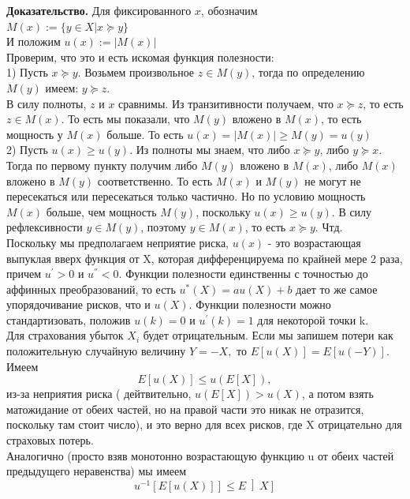 \documentclass[12pt,a4paper]{article}
\begin{document}
{\large \bf Доказательство.} Для фиксированного $x$, обозначим \\
$M(x) := \{ y \in X | x \succeq y\}$\\
И положим $u(x):= |M(x)|$\\
Проверим, что это и есть искомая функция полезности:\\
1) Пусть $x \succeq y$. Возьмем произвольное $z \in M(y)$, тогда по определению $M(y)$ имеем: $y \succeq z$.\\
В силу полноты, $z$ и $x$ сравнимы. Из транзитивности получаем, что $x \succeq z$, то есть $z \in M(x)$.
То есть мы показали, что $M(y)$ вложено в $M(x)$, то есть мощность у $M(x)$ больше. 
То есть $u(x) = |M(x)| \geq M(y) = u(y)$\\
2) Пусть $u(x) \geq u(y)$. Из полноты мы знаем, что либо $x \succeq y$, либо $y \succeq x$. 
Тогда по первому пункту получим либо $M(y)$ вложено в $M(x)$, либо $M(x)$ вложено в $M(y)$ соответственно. То есть $M(x)$ и $M(y)$ не могут не пересекаться или пересекаться только частично. Но по условию мощность $M(x)$ больше, чем мощность $M(y)$, поскольку $u(x) \geq u(y)$.
 В силу рефлексивности  $y \in M(y)$, поэтому  $y \in M(x)$, то есть $ x \succeq y$. Чтд. \\


Поскольку мы предполагаем неприятие риска, $u(x)$ - это возрастающая выпуклая вверх функция от X,  которая дифференцируема по крайней мере 2 раза, причем $u^{'} > 0$ и $u^{''} < 0.$ Функции полезности единственны с точностью до аффинных преобразований, то есть $u^{*}(X) = au(X) + b $ дает то же самое упорядочивание рисков, что и $u(X).$ Функции полезности можно стандартизовать, положив $u(k)=0$ и $u^{'}(k) = 1$ для некоторой точки k.\\
Для страхования убыток $X_i$ будет отрицательным. Если мы запишем потери как положительную случайную величину $Y=-X,$ то $ E \left[ u(X) \right]  = E  \left[ u(-Y) \right] . $\\

Имеем $$ E \left[  u(X) \right]   \leq  u(E  \left[  X \right]  ),$$
 из-за неприятия риска ( дейтвительно, $u(E  \left[  X \right]  ) >  u(X)$, а потом взять матожидание от обеих частей,  но на правой части это никак не отразится, поскольку там стоит число), и это верно для всех рисков, где X отрицательно для страховых потерь.\\
Аналогично (просто взяв монотонно возрастающую функцию u от обеих частей предыдущего неравенства) мы имеем $$u^{-1}  \left[ E \left[ u(X) \right] \right]   \leq  E  \left]  X \right]  $$
\end{document}
